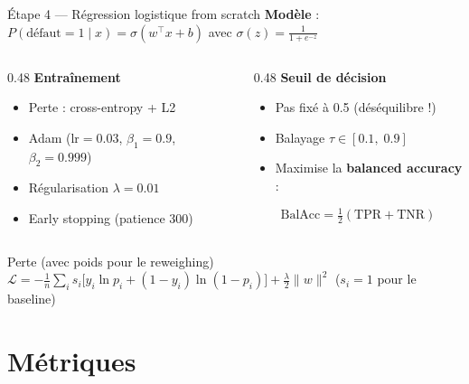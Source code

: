 \documentclass[aspectratio=169, 11pt]{beamer}
\begin{document}
\begin{frame}{\'Etape 4 --- R\'egression logistique from scratch}
\textbf{Mod\`ele} :
$P(\text{d\'efaut}=1 \mid x) = \sigma(w^\top x + b)$
\quad avec \quad
$\sigma(z) = \frac{1}{1 + e^{-z}}$

\vspace{0.5em}
\begin{columns}[T]
\begin{column}{0.48\textwidth}
\textbf{Entra\^inement}
\begin{itemize}
    \item Perte : cross-entropy + L2
    \item Adam ($\text{lr}=0.03$, $\beta_1\!=\!0.9$, $\beta_2\!=\!0.999$)
    \item R\'egularisation $\lambda = 0.01$
    \item Early stopping (patience 300)
\end{itemize}
\end{column}
\begin{column}{0.48\textwidth}
\textbf{Seuil de d\'ecision}
\begin{itemize}
    \item Pas fix\'e \`a 0.5 (d\'es\'equilibre !)
    \item Balayage $\tau \in [0.1,\; 0.9]$
    \item Maximise la \textbf{balanced accuracy} :
\end{itemize}
$$\text{BalAcc} = \tfrac{1}{2}(\text{TPR} + \text{TNR})$$
\end{column}
\end{columns}

\vspace{0.5em}
\begin{block}{Perte (avec poids pour le reweighing)}
$\mathcal{L} = -\frac{1}{n}\sum_{i} s_i \big[ y_i \ln p_i + (1-y_i) \ln(1 - p_i) \big] + \frac{\lambda}{2} \|w\|^2$
\hfill {\small ($s_i = 1$ pour le baseline)}
\end{block}
\end{frame}

\section{M\'etriques}
\end{document}
